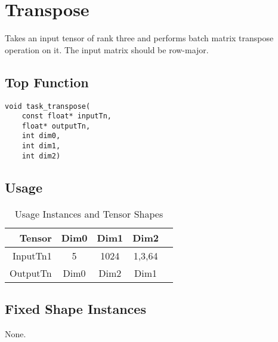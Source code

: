 \documentclass[•]{article}
\begin{document}
\clearpage









\section{Transpose}
Takes an input tensor of rank three and performs batch matrix transpose operation on it. The input matrix should be row-major.

\subsection{Top Function}
\begin{lstlisting}
void task_transpose(
	const float* inputTn,
	float* outputTn,
	int dim0,
	int dim1,
	int dim2)
\end{lstlisting}

\subsection{Usage}
\begin{table}[htbp] %
\caption{Usage Instances and Tensor Shapes}
\label{tab:shapes_transpose}
	\begin{center}
		\begin{tabular}{|r|c|c|c|c|} 
		\hline	
		Tensor & Dim0 & Dim1 & Dim2\\ 
		\hline	
		InputTn1 &
			5 &
			1024 &
			1,3,64\\ 
		\hline
		OutputTn &
			Dim0 & 
			Dim2 & 
			Dim1 \\
		\hline
		\end{tabular}
	\end{center}
\end{table}

\subsection{Fixed Shape Instances}
None.
\end{document}
